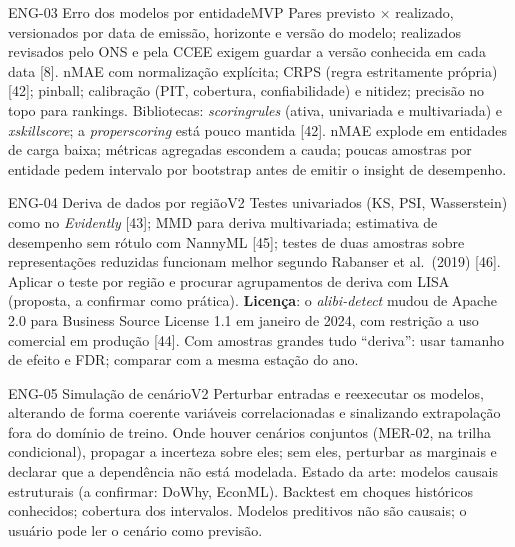 \begin{ficha}{ENG-03 \textperiodcentered{} Erro dos modelos por entidade}{MVP}
 Pares previsto × realizado, versionados por data de emissão,
horizonte e versão do modelo; realizados revisados pelo ONS e pela CCEE
exigem guardar a versão conhecida em cada data [8].
 nMAE com normalização explícita; CRPS (regra estritamente
própria) [42]; pinball; calibração (PIT, cobertura, confiabilidade) e
nitidez; precisão no topo para rankings. Bibliotecas: \emph{scoringrules}
(ativa, univariada e multivariada) e \emph{xskillscore}; a
\emph{properscoring} está pouco mantida [42].
 nMAE explode em entidades de carga baixa; métricas
agregadas escondem a cauda; poucas amostras por entidade pedem intervalo por
bootstrap antes de emitir o insight de desempenho.
\end{ficha}

\begin{ficha}{ENG-04 \textperiodcentered{} Deriva de dados por região}{V2}
 Testes univariados (KS, PSI, Wasserstein) como no
\emph{Evidently} [43]; MMD para deriva multivariada; estimativa de desempenho
sem rótulo com NannyML [45]; testes de duas amostras sobre representações
reduzidas funcionam melhor segundo Rabanser et al.\ (2019) [46]. Aplicar o
teste por região e procurar agrupamentos de deriva com LISA (proposta, a
confirmar como prática).
 \textbf{Licença}: o \emph{alibi-detect} mudou de Apache 2.0
para Business Source License 1.1 em janeiro de 2024, com restrição a uso
comercial em produção [44]. Com amostras grandes tudo ``deriva'': usar
tamanho de efeito e FDR; comparar com a mesma estação do ano.
\end{ficha}

\begin{ficha}{ENG-05 \textperiodcentered{} Simulação de cenário}{V2}
 Perturbar entradas e reexecutar os modelos, alterando de
forma coerente variáveis correlacionadas e sinalizando extrapolação fora do
domínio de treino. Onde houver cenários conjuntos (MER-02, na trilha
condicional), propagar a incerteza sobre eles; sem eles, perturbar as
marginais e declarar que a dependência não está modelada.
Estado da arte: modelos causais estruturais (a confirmar: DoWhy, EconML).
 Backtest em choques históricos conhecidos; cobertura dos
intervalos.
 Modelos preditivos não são causais; o usuário pode ler o
cenário como previsão.
\end{ficha}

